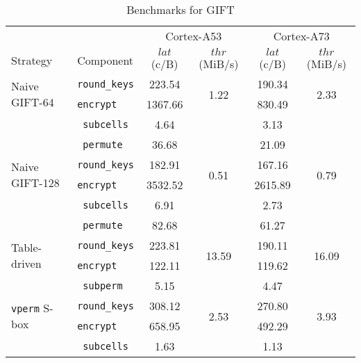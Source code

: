 \begin{table}[h!]
    \centering
    \small
    \caption{Benchmarks for GIFT}
    \begin{tabular}{llcccc}
        \toprule
        & & \multicolumn{2}{c}{Cortex-A53} & \multicolumn{2}{c}{Cortex-A73} \\
        \cmidrule(lr){3-4}\cmidrule(lr){5-6}
        Strategy & Component & $lat$ (c/B) & $thr$ (MiB/s) & $lat$ (c/B) & $thr$ (MiB/s) \\
        \midrule
        \multirow{2}{*}{Naive GIFT-64} & \texttt{round\_keys} & 223.54 & \multirow{2}{*}{1.22} & 190.34 & \multirow{2}{*}{2.33} \\
                                                & \texttt{encrypt} & 1367.66 & &  830.49 & \\
        \cmidrule(lr){2-2}
                                                & \texttt{ subcells} & 4.64 & & 3.13 & \\
                                                & \texttt{  permute} & 36.68 & & 21.09 & \\
        \midrule
        \multirow{2}{*}{Naive GIFT-128} & \texttt{round\_keys} & 182.91 & \multirow{2}{*}{0.51} & 167.16 & \multirow{2}{*}{0.79} \\
                                                 & \texttt{encrypt} & 3532.52 & & 2615.89 & \\
        \cmidrule(lr){2-2}
                                                 & \texttt{ subcells} & 6.91 & & 2.73 & \\
                                                 & \texttt{ permute} & 82.68 & & 61.27 & \\
        \midrule
        \multirow{2}{*}{Table-driven} & \texttt{round\_keys} & 223.81 & \multirow{2}{*}{13.59} & 190.11 & \multirow{2}{*}{16.09} \\
                                      & \texttt{encrypt} & 122.11 & & 119.62 & \\
        \cmidrule(lr){2-2}
                                      & \texttt{ subperm} & 5.15 & & 4.47 & \\
        \midrule
        \multirow{2}{*}{\texttt{vperm} S-box} & \texttt{round\_keys} & 308.12 & \multirow{2}{*}{2.53} & 270.80 & \multirow{2}{*}{3.93} \\
                                              & \texttt{encrypt} & 658.95 & & 492.29 & \\
        \cmidrule(lr){2-2}
                                              & \texttt{ subcells} & 1.63 & & 1.13 & \\

\end{tabular}
\end{table}
